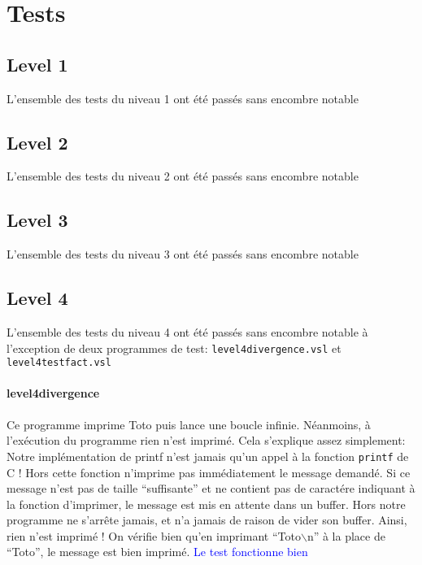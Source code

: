 \documentclass{article}
\begin{document}
\section{Tests}

\subsection{Level 1}

L'ensemble des tests du niveau 1 ont été passés sans encombre notable

\subsection{Level 2}

L'ensemble des tests du niveau 2 ont été passés sans encombre notable

\subsection{Level 3}

L'ensemble des tests du niveau 3 ont été passés sans encombre notable

\subsection{Level 4}

L'ensemble des tests du niveau 4 ont été passés sans encombre notable à
l'exception de deux programmes de test: \texttt{level4divergence.vsl} et
\texttt{level4testfact.vsl}

\paragraph{level4divergence}

Ce programme imprime Toto puis lance une boucle infinie. Néanmoins, à
l'exécution du programme rien n'est imprimé. Cela s'explique assez simplement:
Notre implémentation de printf n'est jamais qu'un appel à la fonction
\texttt{printf} de C ! Hors cette fonction n'imprime pas immédiatement le message
demandé. Si ce message n'est pas de taille ``suffisante'' et ne contient pas de
caractére indiquant à la fonction d'imprimer, le message est mis en attente dans
un buffer. Hors notre programme ne s'arrête jamais, et n'a jamais de raison de
vider son buffer. Ainsi, rien n'est imprimé ! On vérifie bien qu'en imprimant
``Toto$\backslash$n'' à la place de ``Toto'', le message est bien imprimé. \textcolor{blue}{Le
  test fonctionne bien}
\end{document}
